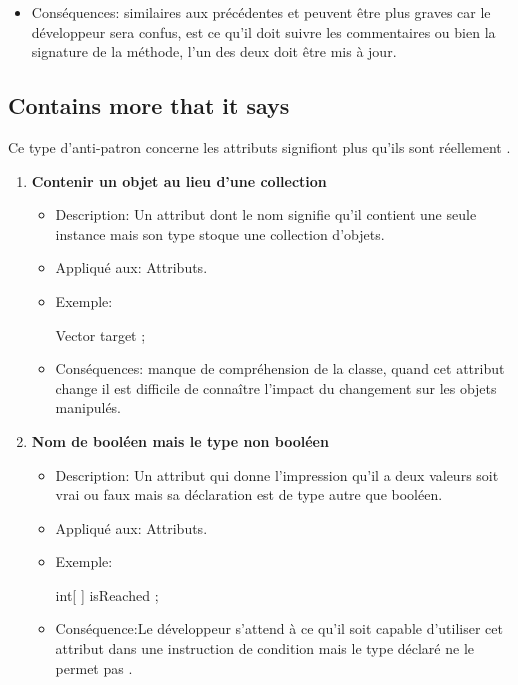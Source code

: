 \begin{enumerate}
\begin{itemize}
\begin{framed}
{\selectfont

/∗Returns true if this listener has a target
∗for a back navigation. Only one listener
∗needs to return true for the back button
∗to be enabled.∗/
public boolean isNavigateForwardEnabled()\{
boolean enabled = false;
if(\_isForwardEnabled == 1)\{enabled=true;\}
else\{
if(\_isForwardEnabled != 0)\{
enabled = navigateForward(false) != null;
\}
\}
return enabled;
\}
}
\end{framed}
\item Conséquences: similaires aux précédentes et peuvent être plus graves car le développeur sera confus, est ce qu’il doit suivre les commentaires ou bien la signature de la méthode, l’un des deux doit être mis à jour.
\end{itemize}
\end{enumerate}
\subsection{Contains more that it says}
Ce type d'anti-patron concerne les  attributs signifiont plus qu'ils sont réellement \cite{arnaoudova2013new}.
\begin{enumerate}
    

\item \textbf {Contenir un objet au lieu d'une collection}
\begin{itemize}
\item Description: Un attribut dont le nom signifie qu’il contient une seule instance mais son type stoque une collection d’objets.
\item Appliqué aux: Attributs.
\item Exemple: 
\begin{framed}

{\selectfont
Vector target ;
}
\end{framed}
\item Conséquences: manque de compréhension de la classe, quand cet attribut change il est difficile de connaître l’impact du changement sur les objets manipulés.
\end{itemize}

\item \textbf {Nom de booléen mais le type non booléen}
\begin{itemize}

\item Description: Un attribut qui donne l’impression qu’il a deux valeurs soit vrai ou faux mais sa déclaration est de type  autre que booléen.
\item Appliqué aux: Attributs.
\item Exemple:  
\begin{framed}

{\selectfont
 int[ ] isReached ;
}
\end{framed}
\item Conséquence:Le développeur s’attend à ce qu’il soit capable d’utiliser cet attribut dans une instruction de condition mais le type déclaré ne le permet pas .

\end{itemize}
\end{enumerate}
